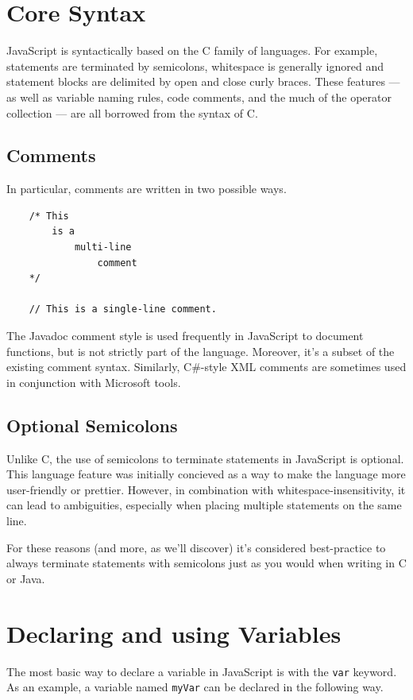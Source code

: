 \documentclass[11pt,letter]{book}
\begin{document}
    \section{Core Syntax}
    JavaScript is syntactically based on the C family of languages. For example, statements are 
    terminated by semicolons, whitespace is generally ignored and statement blocks are delimited by 
    open and close curly braces. These features --- as well as variable naming rules, code comments, 
    and the much of the operator collection --- are all borrowed from the syntax of C.
    
    \subsection{Comments}
    In particular, comments are written in two possible ways.
    
    \begin{verbatim}
    /* This
        is a
            multi-line
                comment
    */
     
    // This is a single-line comment.
    \end{verbatim}
    
    The Javadoc comment style is used frequently in JavaScript to document functions, but is not 
    strictly part of the language. Moreover, it's a subset of the existing comment syntax. 
    Similarly, C\#-style XML comments are sometimes used in conjunction with Microsoft tools.
    
    \subsection{Optional Semicolons}
    Unlike C, the use of semicolons to terminate statements in JavaScript is optional. This language 
    feature was initially concieved as a way to make the language more user-friendly or prettier. 
    However, in combination with whitespace-insensitivity, it can lead to ambiguities, especially 
    when placing multiple statements on the same line.
    
    For these reasons (and more, as we'll discover) it's considered best-practice to always 
    terminate statements with semicolons just as you would when writing in C or Java.
    
    \section{Declaring and using Variables}
    The most basic way to declare a variable in JavaScript is with the \texttt{var} keyword. As an 
    example, a variable named \texttt{myVar} can be declared in the following way.
    
\end{document}

